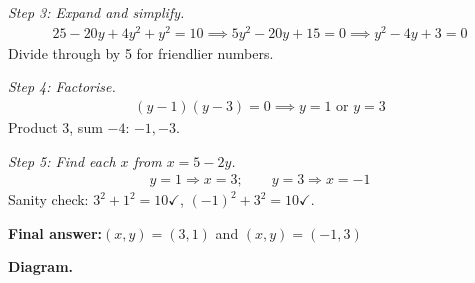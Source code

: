 \documentclass[11pt]{article}
\begin{document}
\textit{Step 3: Expand and simplify.}
\[\begin{gathered}
25 - 20y + 4y^2 + y^2 = 10 \implies 5y^2 - 20y + 15 = 0 \implies y^2 - 4y + 3 = 0
\end{gathered}\]
Divide through by 5 for friendlier numbers.

\textit{Step 4: Factorise.}
\[\begin{gathered}
(y - 1)(y - 3) = 0 \implies y = 1 \text{ or } y = 3
\end{gathered}\]
Product 3, sum \( -4 \): \( -1, -3 \).

\textit{Step 5: Find each \( x \) from \( x = 5 - 2y \).}
\[\begin{gathered}
y = 1 \Rightarrow x = 3; \qquad y = 3 \Rightarrow x = -1
\end{gathered}\]
Sanity check: \( 3^2 + 1^2 = 10 \checkmark \), \( (-1)^2 + 3^2 = 10 \checkmark \).

\begin{answerbox}
\textbf{Final answer:}\quad \(\displaystyle (x, y) = (3, 1)\) and \(\displaystyle (x, y) = (-1, 3)\)
\end{answerbox}
\textbf{Diagram.}
\end{document}
